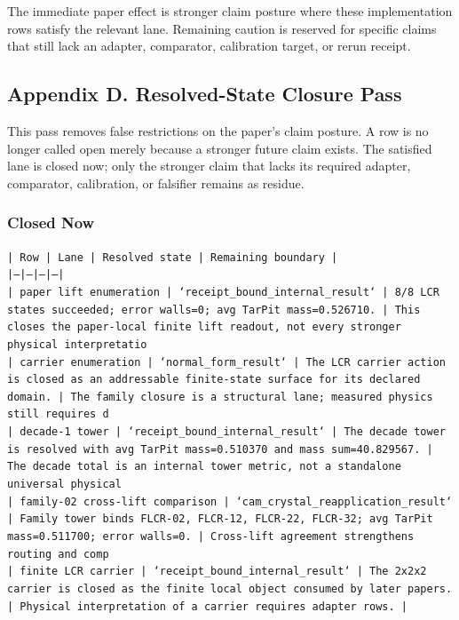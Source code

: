 \documentclass[11pt]{article}
\begin{document}
The immediate paper effect is stronger claim posture where these implementation rows satisfy the relevant lane. Remaining caution is reserved for specific claims that still lack an adapter, comparator, calibration target, or rerun receipt.

\subsection*{Appendix D. Resolved-State Closure Pass}

This pass removes false restrictions on the paper's claim posture. A row is no longer called open merely because a stronger future claim exists. The satisfied lane is closed now; only the stronger claim that lacks its required adapter, comparator, calibration, or falsifier remains as residue.

\subsubsection*{Closed Now}

\noindent\texttt{| Row | Lane | Resolved state | Remaining boundary |}\\
\noindent\texttt{|---|---|---|---|}\\
\noindent\texttt{| paper lift enumeration | `receipt\_bound\_internal\_result` | 8/8 LCR states succeeded; error walls=0; avg TarPit mass=0.526710. | This closes the paper-local finite lift readout, not every stronger physical interpretatio}\\
\noindent\texttt{| carrier enumeration | `normal\_form\_result` | The LCR carrier action is closed as an addressable finite-state surface for its declared domain. | The family closure is a structural lane; measured physics still requires d}\\
\noindent\texttt{| decade-1 tower | `receipt\_bound\_internal\_result` | The decade tower is resolved with avg TarPit mass=0.510370 and mass sum=40.829567. | The decade total is an internal tower metric, not a standalone universal physical }\\
\noindent\texttt{| family-02 cross-lift comparison | `cam\_crystal\_reapplication\_result` | Family tower binds FLCR-02, FLCR-12, FLCR-22, FLCR-32; avg TarPit mass=0.511700; error walls=0. | Cross-lift agreement strengthens routing and comp}\\
\noindent\texttt{| finite LCR carrier | `receipt\_bound\_internal\_result` | The 2x2x2 carrier is closed as the finite local object consumed by later papers. | Physical interpretation of a carrier requires adapter rows. |}\\
\end{document}
